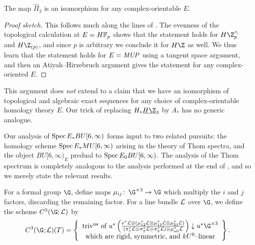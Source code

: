 \begin{corollary}\label{Pi3ForCplxOrientableE}
The map \(\hat \Pi_3\) is an isomorphism for any complex-orientable \(E\).
\end{corollary}
\begin{proof}[Proof sketch]
This follows much along the lines of .  The evenness of the topological calculation at \(E = \HFp\) shows that the statement holds for \(H\Z^\wedge_p\) and \(H\Z_{(p)}\), and since \(p\) is arbitrary we conclude it for \(H\Z\) as well.  We thus learn that the statement holds for \(E = \mathit{MUP}\) using a tangent space argument, and then an Atiyah--Hirzebruch argument gives the statement for any complex-oriented \(E\).
\end{proof}

\begin{remark}
This argument does \emph{not} extend to a claim that we have an isomorphism of topological and algebraic exact sequences for any choice of complex-orientable homology theory \(E\).  Our trick of replacing \(H_* \OS{H\Z}{3}\) by \(A_*\) has no generic analogue.
\end{remark}

Our analysis of \(\operatorname{Spec} E_* BU[6, \infty)\) forms input to two related pursuits: the homology scheme \(\operatorname{Spec} E_* MU[6, \infty)\) arising in the theory of Thom spectra, and the object \(BU[6, \infty)_E\) predual to \(\operatorname{Spec} E_0 BU[6, \infty)\).  The analysis of the Thom spectrum is completely analogous to the analysis performed at the end of , and so we merely state the relevant results.

\begin{definition}
For a formal group \(\G\), define maps \(\mu_{ij}\co \G^{\times 3} \to \G\) which multiply the \(i\){\th} and \(j\){\th} factors, discarding the remaining factor.  For a line bundle \(\mathcal{L}\) over \(\G\), we define the scheme \(C^3(\G; \sheaf L)\) by \[C^3(\G; \sheaf L)(T) = \left\{\begin{array}{c}\text{triv\textsuperscript{ns} of \(u^*\left(\frac{e^* \sheaf L \otimes (\mu_{12}^* \sheaf L \otimes \mu_{13}^* \sheaf L \otimes \mu_{23}^* \sheaf L)}{(\pi_1^* \sheaf L \otimes \pi_2^* \sheaf L \otimes \pi_3^* \sheaf L) \otimes \mu_{\mathrm{all}}^* \sheaf L}\right) \downarrow u^* \G^{\times 3}\)} \\ \text{which are rigid, symmetric, and \(kU^0\)--linear} \end{array}\right\}.\]
\end{definition}

